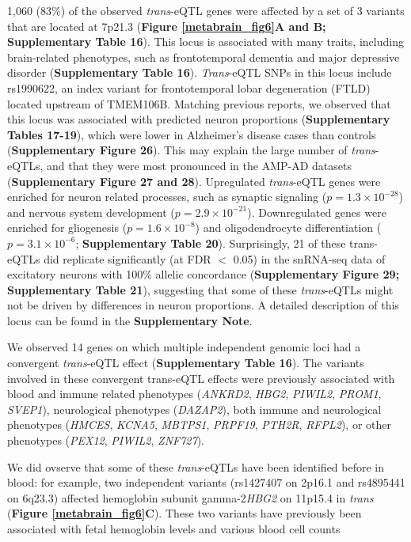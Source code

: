 1,060 (83\%) of the observed \emph{trans}-eQTL genes were affected by a set of 3 variants that are located at 7p21.3 (\textbf{Figure \ref{metabrain_fig6}A and B; Supplementary Table 16}). This locus is associated with many traits, including brain-related phenotypes, such as frontotemporal dementia\cite{ferrariFrontotemporalDementiaIts2014} and major depressive disorder\cite{sankaranHumanFetalHemoglobin2008} (\textbf{Supplementary Table 16}). \emph{Trans}-eQTL SNPs in this locus include rs1990622, an index variant for frontotemporal lobar degeneration (FTLD)\cite{jiangCMYBInvolvedRegulation2006} located upstream of TMEM106B. Matching previous reports\cite{metaisGenomeEditingHBG12019,jDalfampridineBriefReview2011}, we observed that this locus was associated with predicted neuron proportions (\textbf{Supplementary Tables 17-19}), which were lower in Alzheimer’s disease cases than controls (\textbf{Supplementary Figure 26}). This may explain the large number of \emph{trans}-eQTLs, and that they were most pronounced in the AMP-AD datasets (\textbf{Supplementary Figure 27 and 28}). Upregulated \emph{trans}-eQTL genes were enriched for neuron related processes, such as synaptic signaling ($p=1.3 \times 10^{-28}$) and nervous system development ($p=2.9 \times 10^{-21}$). Downregulated genes were enriched for gliogenesis ($p=1.6 \times 10^{-8}$) and oligodendrocyte differentiation ($p=3.1 \times 10^{-6}$; \textbf{Supplementary Table 20}). Surprisingly, 21 of these trans-eQTLs did replicate significantly (at FDR $<$ 0.05) in the snRNA-seq data of excitatory neurons with 100\% allelic concordance (\textbf{Supplementary Figure 29; Supplementary Table 21}), suggesting that some of these \emph{trans}-eQTLs might not be driven by differences in neuron proportions. A detailed description of this locus can be found in the \textbf{Supplementary Note}. 

We observed 14 genes on which multiple independent genomic loci had a convergent \emph{trans}-eQTL effect (\textbf{Supplementary Table 16}). The variants involved in these convergent trans-eQTL effects were previously associated with blood and immune related phenotypes (\emph{ANKRD2}, \emph{HBG2}, \emph{PIWIL2}, \emph{PROM1}, \emph{SVEP1}), neurological phenotypes (\emph{DAZAP2}), both immune and neurological phenotypes (\emph{HMCES}, \emph{KCNA5}, \emph{MBTPS1}, \emph{PRPF19}, \emph{PTH2R}, \emph{RFPL2}), or other phenotypes (\emph{PEX12}, \emph{PIWIL2}, \emph{ZNF727}). 

We did ovserve that some of these \emph{trans}-eQTLs have been identified before in blood: for example, two independent variants (rs1427407 on 2p16.1 and rs4895441 on 6q23.3) affected hemoglobin subunit gamma-2\emph{HBG2} on 11p15.4 in \emph{trans} (\textbf{Figure \ref{metabrain_fig6}C}). These two variants have previously been associated with fetal hemoglobin levels\cite{sankaranHumanFetalHemoglobin2008,jiangCMYBInvolvedRegulation2006,metaisGenomeEditingHBG12019} and various blood cell counts

